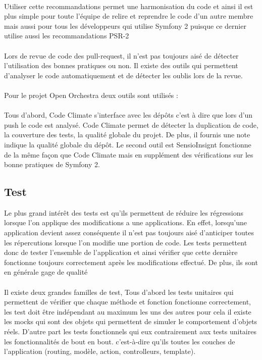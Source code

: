 \paragraph{}
Utiliser cette recommandations permet une harmonisation du code et ainsi il est plus simple pour toute l'équipe de relire et reprendre le code d'un autre membre mais aussi pour tous les développeurs qui utilise Symfony 2 puisque ce dernier utilise aussi les recommandations PSR-2
\paragraph{}
Lors de revue de code des pull-request, il n'est pas toujours aisé de détecter l'utilisation des bonnes pratiques ou non. Il existe des outils qui permettent d'analyser le code automatiquement et de détecter les oublis lors de la revue.
\paragraph{}
Pour le projet Open Orchestra deux outils sont utilisés : 
\paragraph{}
Tous d'abord, Code Climate s'interface avec les dépôts c'est à dire que lors d'un push le code est analysé.
Code Climate permet de détecter la duplication de code, la couverture des tests, la qualité globale du projet. De plus, il fournis une note indique la qualité globale du dépôt. 
Le second outil est SensioInsignt fonctionne de la même façon que Code Climate mais en supplément des vérifications sur les bonne pratiques de Symfony 2.
\subsection{Test}
Le plus grand intérêt des tests est qu'ils permettent de réduire les régressions lorsque l'on applique des modifications a une applications. En effet, lorsqu'une application devient assez conséquente il n'est pas toujours aisé d'anticiper toutes les répercutions lorsque l'on modifie une portion de code. Les tests permettent donc de tester l'ensemble de l'application et ainsi vérifier que cette dernière fonctionne toujours correctement après les modifications effectué. 
De plus, ils sont en générale gage de qualité
 \paragraph{}
 Il existe deux grandes familles de test, Tous d'abord les tests unitaires qui permettent de vérifier que chaque méthode et fonction fonctionne correctement, les test doit être indépendant au maximum les uns des autres pour cela il existe les mocks qui sont des objets qui permettent de simuler le comportement d'objets \og{}réels\fg{}.
 D'autre part les tests fonctionnels qui eux contrairement aux tests unitaires les fonctionnalités de bout en bout. c'est-à-dire qu'ils toutes les couches de l'application (routing, modèle, action, controlleurs, template).
